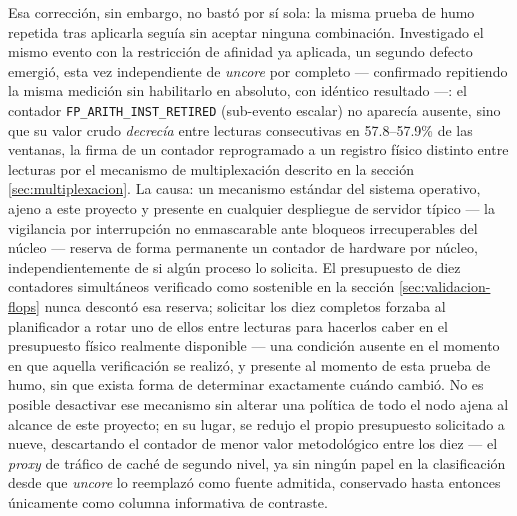 \documentclass[12pt,oneside,spanish]{book}
\begin{document}
Esa corrección, sin embargo, no bastó por sí sola: la misma prueba de humo repetida tras aplicarla seguía sin aceptar ninguna combinación. Investigado el mismo evento con la restricción de afinidad ya aplicada, un segundo defecto emergió, esta vez independiente de \textit{uncore} por completo --- confirmado repitiendo la misma medición sin habilitarlo en absoluto, con idéntico resultado ---: el contador \texttt{FP\_ARITH\_INST\_RETIRED} (sub-evento escalar) no aparecía ausente, sino que su valor crudo \textit{decrecía} entre lecturas consecutivas en 57.8--57.9\% de las ventanas, la firma de un contador reprogramado a un registro físico distinto entre lecturas por el mecanismo de multiplexación descrito en la sección \ref{sec:multiplexacion}. La causa: un mecanismo estándar del sistema operativo, ajeno a este proyecto y presente en cualquier despliegue de servidor típico --- la vigilancia por interrupción no enmascarable ante bloqueos irrecuperables del núcleo --- reserva de forma permanente un contador de hardware por núcleo, independientemente de si algún proceso lo solicita. El presupuesto de diez contadores simultáneos verificado como sostenible en la sección \ref{sec:validacion-flops} nunca descontó esa reserva; solicitar los diez completos forzaba al planificador a rotar uno de ellos entre lecturas para hacerlos caber en el presupuesto físico realmente disponible --- una condición ausente en el momento en que aquella verificación se realizó, y presente al momento de esta prueba de humo, sin que exista forma de determinar exactamente cuándo cambió. No es posible desactivar ese mecanismo sin alterar una política de todo el nodo ajena al alcance de este proyecto; en su lugar, se redujo el propio presupuesto solicitado a nueve, descartando el contador de menor valor metodológico entre los diez --- el \textit{proxy} de tráfico de caché de segundo nivel, ya sin ningún papel en la clasificación desde que \textit{uncore} lo reemplazó como fuente admitida, conservado hasta entonces únicamente como columna informativa de contraste.
\end{document}
